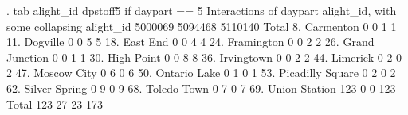 . tab alight_id dpstoff5 if daypart == 5
{\smallskip}
                      {\VBAR}     Interactions of daypart
                      {\VBAR} alight_id, with some collapsing
            alight_id {\VBAR}   5000069    5094468    5110140 {\VBAR}     Total
         8. Carmenton {\VBAR}         0          0          1 {\VBAR}         1 
         11. Dogville {\VBAR}         0          0          5 {\VBAR}         5 
         18. East End {\VBAR}         0          0          4 {\VBAR}         4 
       24. Framington {\VBAR}         0          0          2 {\VBAR}         2 
   26. Grand Junction {\VBAR}         0          0          1 {\VBAR}         1 
       30. High Point {\VBAR}         0          0          8 {\VBAR}         8 
       36. Irvingtown {\VBAR}         0          0          2 {\VBAR}         2 
         44. Limerick {\VBAR}         0          2          0 {\VBAR}         2 
      47. Moscow City {\VBAR}         0          6          0 {\VBAR}         6 
     50. Ontario Lake {\VBAR}         0          1          0 {\VBAR}         1 
 53. Picadilly Square {\VBAR}         0          2          0 {\VBAR}         2 
    62. Silver Spring {\VBAR}         0          9          0 {\VBAR}         9 
      68. Toledo Town {\VBAR}         0          7          0 {\VBAR}         7 
    69. Union Station {\VBAR}       123          0          0 {\VBAR}       123 
                Total {\VBAR}       123         27         23 {\VBAR}       173 
{\smallskip}
{\smallskip}

